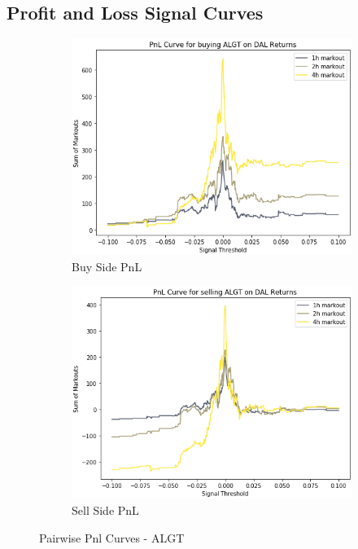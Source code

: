 \documentclass{article}
\begin{document}
\subsection{Profit and Loss Signal Curves}
\begin{figure}[h!]
  \centering
  \begin{subfigure}{.5\textwidth}
    \centering
    \includegraphics[width=.95\linewidth]{../Figures/pair_Pnl_Curve_buy_ALGT_on_DAL.png}
    \caption{Buy Side PnL}
  \end{subfigure}%
  \begin{subfigure}{.5\textwidth}
    \centering
    \includegraphics[width=.95\linewidth]{../Figures/pair_Pnl_Curve_sell_ALGT_on_DAL.png}
    \caption{Sell Side PnL}
  \end{subfigure}
  \caption{Pairwise Pnl Curves - ALGT}
\end{figure}
\end{document}
